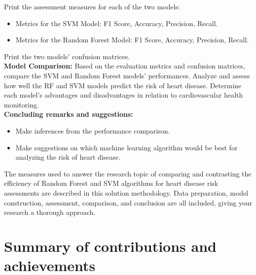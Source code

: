 Print the assessment measures for each of the two models:
\begin{itemize}
    \item Metrics for the SVM Model: F1 Score, Accuracy, Precision, Recall.
    \item Metrics for the Random Forest Model: F1 Score, Accuracy, Precision, Recall.
\end{itemize}

Print the two models' confusion matrices.
\\
\textbf{Model Comparison:} Based on the evaluation metrics and confusion matrices, compare the SVM and Random Forest models' performances. Analyze and assess how well the RF and SVM models predict the risk of heart disease. Determine each model's advantages and disadvantages in relation to cardiovascular health monitoring.
\\
\textbf{Concluding remarks and suggestions:}
\begin{itemize}
    \item Make inferences from the performance comparison.
    \item Make suggestions on which machine learning algorithm would be best for analyzing the risk of heart disease.
\end{itemize}

The measures used to answer the research topic of comparing and contrasting the efficiency of Random Forest and SVM algorithms for heart disease risk assessments are described in this solution methodology. Data preparation, model construction, assessment, comparison, and conclusion are all included, giving your research a thorough approach.



\section{Summary of contributions and achievements} %
\label{sec:intro_sum_results} %





